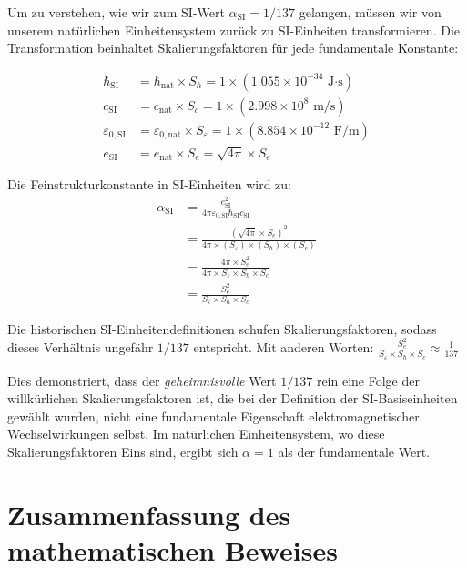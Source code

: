 \documentclass[12pt,a4paper]{article}
\begin{document}
	Um zu verstehen, wie wir zum SI-Wert $\alpha_{\text{SI}} = 1/137$ gelangen, müssen wir von unserem natürlichen Einheitensystem zurück zu SI-Einheiten transformieren. Die Transformation beinhaltet Skalierungsfaktoren für jede fundamentale Konstante:
	
	\begin{align}
		\hbar_{\text{SI}} &= \hbar_{\text{nat}} \times S_{\hbar} = 1 \times (1.055 \times 10^{-34} \text{ J·s})\\
		c_{\text{SI}} &= c_{\text{nat}} \times S_c = 1 \times (2.998 \times 10^8 \text{ m/s})\\
		\varepsilon_{0,\text{SI}} &= \varepsilon_{0,\text{nat}} \times S_{\varepsilon} = 1 \times (8.854 \times 10^{-12} \text{ F/m})\\
		e_{\text{SI}} &= e_{\text{nat}} \times S_e = \sqrt{4\pi} \times S_e
	\end{align}
	
	Die Feinstrukturkonstante in SI-Einheiten wird zu:
	\begin{align}
		\alpha_{\text{SI}} &= \frac{e_{\text{SI}}^2}{4\pi\varepsilon_{0,\text{SI}}\hbar_{\text{SI}} c_{\text{SI}}}\\
		&= \frac{(\sqrt{4\pi} \times S_e)^2}{4\pi \times (S_{\varepsilon}) \times (S_{\hbar}) \times (S_c)}\\
		&= \frac{4\pi \times S_e^2}{4\pi \times S_{\varepsilon} \times S_{\hbar} \times S_c}\\
		&= \frac{S_e^2}{S_{\varepsilon} \times S_{\hbar} \times S_c}
	\end{align}
	
	Die historischen SI-Einheitendefinitionen schufen Skalierungsfaktoren, sodass dieses Verhältnis ungefähr $1/137$ entspricht. Mit anderen Worten:
	$\frac{S_e^2}{S_{\varepsilon} \times S_{\hbar} \times S_c} \approx \frac{1}{137}$
	
	Dies demonstriert, dass der \textit{geheimnisvolle} Wert $1/137$ rein eine Folge der willkürlichen Skalierungsfaktoren ist, die bei der Definition der SI-Basiseinheiten gewählt wurden, nicht eine fundamentale Eigenschaft elektromagnetischer Wechselwirkungen selbst. Im natürlichen Einheitensystem, wo diese Skalierungsfaktoren Eins sind, ergibt sich $\alpha = 1$ als der fundamentale Wert.
	
	\section{Zusammenfassung des mathematischen Beweises}
	
\end{document}
